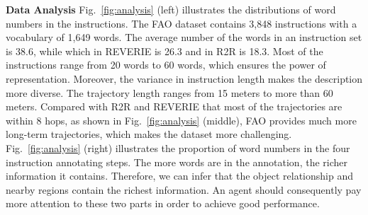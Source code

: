 \documentclass[final]{cvpr}
\begin{document}
\noindent\textbf{Data Analysis} 
Fig.~\ref{fig:analysis} (left) illustrates the distributions of word numbers in the instructions. 
The FAO dataset contains 3,848 instructions with a vocabulary of 1,649 words. The average number of the words in an instruction set is 38.6, while which in REVERIE is 26.3 and in R2R is 18.3.  
Most of the instructions range from 20 words to 60 words, which ensures the power of representation. Moreover, the variance in instruction length makes the description more diverse. 
The trajectory length ranges from 15 meters to more than 60 meters. 
Compared with R2R and REVERIE that most of the trajectories are within 8 hops, as shown in Fig.~\ref{fig:analysis} (middle), FAO provides much more long-term trajectories, which makes the dataset more challenging. 
Fig.~\ref{fig:analysis} (right) illustrates the proportion of word numbers in the four instruction annotating steps. The more words are in the annotation, the richer information it contains. Therefore, we can infer that the object relationship and nearby regions contain the richest information. An agent should consequently pay more attention to these two parts in order to achieve good performance. 
 
\end{document}
